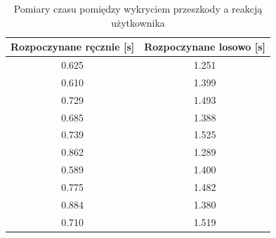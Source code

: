 \documentclass[a4paper,12pt]{book}
\begin{document}
        \begin{table}[H]
    \centering
    \caption{Pomiary czasu pomiędzy wykryciem przeszkody a reakcją użytkownika}
    \begin{tabular}{|c|c|}
        \hline
        \textbf{Rozpoczynane ręcznie [s]} & \textbf{Rozpoczynane losowo [s]} \\
        \hline
        0.625  & 1.251  \\
        \hline
        0.610  & 1.399  \\
        \hline
        0.729  & 1.493  \\
        \hline
        0.685  & 1.388  \\
        \hline
        0.739  & 1.525  \\
        \hline
        0.862  & 1.289  \\
        \hline
        0.589  & 1.400  \\
        \hline
        0.775  & 1.482  \\
        \hline
        0.884  & 1.380  \\
        \hline
        0.710 &  1.519  \\
        \hline
    \end{tabular}
    \label{tab:timers}
\end{table}
\end{document}

